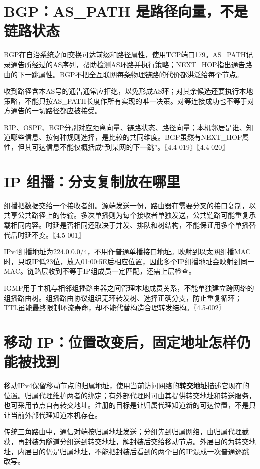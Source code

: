 \section{BGP：AS\_PATH 是路径向量，不是链路状态}\label{cn-04-18}

BGP在自治系统之间交换可达前缀和路径属性，使用TCP端口179。AS\_PATH记录通告所经过的AS序列，帮助检测AS环路并执行策略；NEXT\_HOP指出通告路由的下一跳属性。BGP不把全互联网每条物理链路的代价都洪泛给每个节点。

收到路径含本AS号的通告通常应拒绝，以免形成AS环；对其余候选还要执行本地策略，不能只按AS\_PATH长度作所有实现的唯一决策。对等连接成功也不等于对方通告的一切路径都应被接受。

RIP、OSPF、BGP分别对应距离向量、链路状态、路径向量；本机邻居是谁、知道哪些信息、按何种规则选择，是比较的共同维度。BGP虽然有NEXT\_HOP属性，但其可达信息不能仅概括成``到某网的下一跳''。〖4.4-019〗〖4.4-020〗

\section{IP 组播：分支复制放在哪里}\label{cn-04-19}

组播把数据交给一个接收者组。源端发送一份，路由器在需要分叉的接口复制，以共享公共路径上的传输。多次单播则为每个接收者单独发送，公共链路可能重复承载相同内容。时延是否相同还取决于并发、排队和树结构，不能保证用多个单播替代后时延不变。〖4.5-001〗

IPv4组播地址为224.0.0.0/4，不用作普通单播接口地址。映射到以太网组播MAC时，只取IP低23位，放入01:00:5E后相应位置，因此多个IP组播地址会映射到同一MAC。链路层收到不等于IP组成员一定匹配，还需上层检查。

IGMP用于主机与相邻组播路由器之间管理本地成员关系，不能单独建立跨网络的组播路由树。组播路由协议组织无环转发树、选择正确分支，防止重复循环；TTL虽能最终限制环流寿命，却不能代替构造合理转发结构。〖4.5-002〗

\section{移动 IP：位置改变后，固定地址怎样仍能被找到}\label{cn-04-20}

移动IPv4保留移动节点的归属地址，使用当前访问网络的\textbf{转交地址}描述它现在的位置。归属代理维护两者的绑定；有外部代理时可由其提供转交地址和转送服务，也可采用节点自有转交地址。注册的目标是让归属代理知道新的可达位置，不是只让当前外部代理知道本机存在。

传统三角路由中，通信对端按归属地址发送；分组先到归属网络，由归属代理截获，再封装为隧道分组送到转交地址，解封装后交给移动节点。外层目的为转交地址，内层目的仍是归属地址，不能把封装后看到的两个目的IP混成一次普通逐跳改写。

